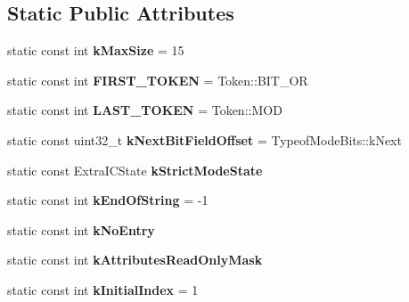 \subsection*{Static Public Attributes}
\begin{DoxyCompactItemize}
\item 
static const int {\bfseries k\+Max\+Size} = 15\hypertarget{classv8_1_1internal_1_1_b_a_s_e___e_m_b_e_d_d_e_d_a15bcf39c4fd250d721486921e0ed9adc}{}\label{classv8_1_1internal_1_1_b_a_s_e___e_m_b_e_d_d_e_d_a15bcf39c4fd250d721486921e0ed9adc}

\item 
static const int {\bfseries F\+I\+R\+S\+T\+\_\+\+T\+O\+K\+EN} = Token\+::\+B\+I\+T\+\_\+\+OR\hypertarget{classv8_1_1internal_1_1_b_a_s_e___e_m_b_e_d_d_e_d_af4248a8f6072e72f884d2a0a75a63293}{}\label{classv8_1_1internal_1_1_b_a_s_e___e_m_b_e_d_d_e_d_af4248a8f6072e72f884d2a0a75a63293}

\item 
static const int {\bfseries L\+A\+S\+T\+\_\+\+T\+O\+K\+EN} = Token\+::\+M\+OD\hypertarget{classv8_1_1internal_1_1_b_a_s_e___e_m_b_e_d_d_e_d_ab4027cf4c5cc9a03a036c2c63053790c}{}\label{classv8_1_1internal_1_1_b_a_s_e___e_m_b_e_d_d_e_d_ab4027cf4c5cc9a03a036c2c63053790c}

\item 
static const uint32\+\_\+t {\bfseries k\+Next\+Bit\+Field\+Offset} = Typeof\+Mode\+Bits\+::k\+Next\hypertarget{classv8_1_1internal_1_1_b_a_s_e___e_m_b_e_d_d_e_d_a5939864f87d61d7074ff997b2965b06c}{}\label{classv8_1_1internal_1_1_b_a_s_e___e_m_b_e_d_d_e_d_a5939864f87d61d7074ff997b2965b06c}

\item 
static const Extra\+I\+C\+State {\bfseries k\+Strict\+Mode\+State}
\item 
static const int {\bfseries k\+End\+Of\+String} = -\/1\hypertarget{classv8_1_1internal_1_1_b_a_s_e___e_m_b_e_d_d_e_d_a7bb2cb09ecc3206a0205cede132d8dca}{}\label{classv8_1_1internal_1_1_b_a_s_e___e_m_b_e_d_d_e_d_a7bb2cb09ecc3206a0205cede132d8dca}

\item 
static const int {\bfseries k\+No\+Entry}\hypertarget{classv8_1_1internal_1_1_b_a_s_e___e_m_b_e_d_d_e_d_a992078347ea9f8f5fb7f7cc63ef64070}{}\label{classv8_1_1internal_1_1_b_a_s_e___e_m_b_e_d_d_e_d_a992078347ea9f8f5fb7f7cc63ef64070}

\item 
static const int {\bfseries k\+Attributes\+Read\+Only\+Mask}
\item 
static const int {\bfseries k\+Initial\+Index} = 1\hypertarget{classv8_1_1internal_1_1_b_a_s_e___e_m_b_e_d_d_e_d_ad76ec72d0571c0737f1ab2f6b420a371}{}\label{classv8_1_1internal_1_1_b_a_s_e___e_m_b_e_d_d_e_d_ad76ec72d0571c0737f1ab2f6b420a371}


\end{DoxyCompactItemize}
